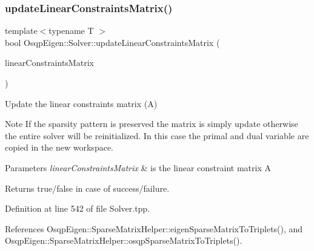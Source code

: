 \mbox{\label{classOsqpEigen_1_1Solver_a4eb3a0b2bec16b00dfc8334d4ff9ab8d}} 
\subsubsection{\texorpdfstring{update\+Linear\+Constraints\+Matrix()}{updateLinearConstraintsMatrix()}\hspace{0.1cm}{\footnotesize\ttfamily [1/2]}}
{\footnotesize\ttfamily template$<$typename T $>$ \\
bool Osqp\+Eigen\+::\+Solver\+::update\+Linear\+Constraints\+Matrix (\begin{DoxyParamCaption}\item[{const Eigen\+::\+Sparse\+Matrix$<$ T $>$ \&}]{linear\+Constraints\+Matrix }\end{DoxyParamCaption})}



Update the linear constraints matrix (A) 

\begin{DoxyNote}{Note}
If the sparsity pattern is preserved the matrix is simply update otherwise the entire solver will be reinitialized. In this case the primal and dual variable are copied in the new workspace.
\end{DoxyNote}

\begin{DoxyParams}{Parameters}
{\em linear\+Constraints\+Matrix} & is the linear constraint matrix A \\
\hline
\end{DoxyParams}
\begin{DoxyReturn}{Returns}
true/false in case of success/failure. 
\end{DoxyReturn}


Definition at line 542 of file Solver.\+tpp.



References Osqp\+Eigen\+::\+Sparse\+Matrix\+Helper\+::eigen\+Sparse\+Matrix\+To\+Triplets(), and Osqp\+Eigen\+::\+Sparse\+Matrix\+Helper\+::osqp\+Sparse\+Matrix\+To\+Triplets().

\mbox{\label{classOsqpEigen_1_1Solver_ae9adb54d29b947222aa7ec788a7d2e30}} 
